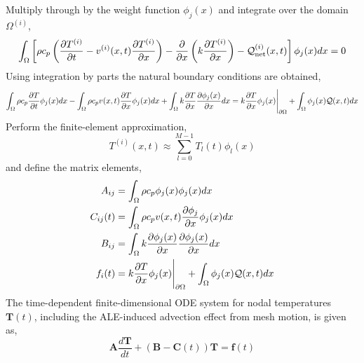 Multiply through by the weight function $\phi_j(x)$ and integrate over the domain $\Omega^{(i)}$,
\begin{equation}
    \int_{\Omega}\left[\rho c_p\left(\frac{\partial T^{(i)}}{\partial t} - v^{(i)}(x,t)\frac{\partial T^{(i)}}{\partial x}\right) - \frac{\partial}{\partial x}\left(k\frac{\partial T^{(i)}}{\partial x}\right) - \mathcal{Q}^{(i)}_{\text{net}}(x,t)\right]\phi_j(x)dx = 0
\end{equation}
Using integration by parts the natural boundary conditions are obtained,
\begin{equation}
    \int_{\Omega}\rho c_p\frac{\partial T}{\partial t}\phi_j(x)dx - \int_{\Omega}\rho c_p v(x,t)\frac{\partial T}{\partial x}\phi_j(x)dx + \int_{\Omega} k\frac{\partial T}{\partial x}\frac{\partial\phi_j(x)}{\partial x} dx = k\frac{\partial T}{\partial x}\phi_j(x)\Bigg|_{\partial\Omega} + \int_{\Omega}\phi_j(x)\mathcal{Q}(x,t)dx
\end{equation}
Perform the finite-element approximation,
\begin{equation}
    T^{(i)}(x,t)\approx\sum_{l=0}^{M-1} T_l(t)\phi_l(x)
\end{equation}
and define the matrix elements,
\begin{align}
    A_{ij} &= \int_{\Omega}\rho c_p\phi_j(x)\phi_j(x)dx\\
    C_{ij}(t) &= \int_{\Omega}\rho c_p v(x,t) \frac{\partial\phi_j}{\partial x}\phi_j(x)dx\\
    B_{ij} &= \int_{\Omega}k\frac{\partial\phi_j(x)}{\partial x}\frac{\partial\phi_j(x)}{\partial x}dx\\
    f_i(t) &= k\frac{\partial T}{\partial x}\phi_j(x)\Bigg|_{\partial\Omega} + \int_{\Omega}\phi_j(x)\mathcal{Q}(x,t)dx
\end{align}
The time-dependent finite-dimensional ODE system for nodal temperatures $\mathbf{T}(t)$, including the ALE-induced advection effect from mesh motion, is given as,
\begin{equation}
    \mathbf{A}\frac{d\mathbf{T}}{dt} + \left(\mathbf{B} - \mathbf{C}(t)\right)\mathbf{T} = \mathbf{f}(t)
\end{equation}

